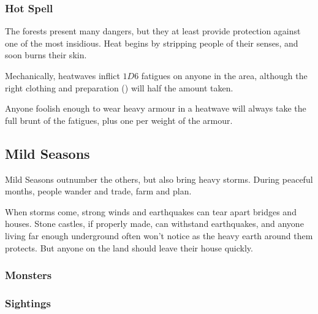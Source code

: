 \begin{multicols}{2}
\subsubsection{Hot Spell}

The forests present many dangers, but they at least provide protection against one of the most insidious.
Heat begins by stripping people of their senses, and soon burns their skin.

Mechanically, heatwaves inflict $1D6$ \glspl{fatigue} on anyone in the area, although the right clothing and preparation () will half the amount taken.

Anyone foolish enough to wear heavy armour in a heatwave will always take the full brunt of the \glspl{fatigue}, plus one per \gls{weight} of the armour.

\end{multicols}

\bigLine

\begin{multicols}{2}

\subsection{Mild Seasons}

Mild Seasons outnumber the others, but also bring heavy storms.
During peaceful months, people wander and trade, farm and plan.

When storms come, strong winds and earthquakes can tear apart bridges and houses.
Stone castles, if properly made, can withstand earthquakes, and anyone living far enough underground often won't notice as the heavy earth around them protects.
But anyone on the land should leave their house quickly.

\encMildVillages

\encMildEdge

\encMildForest

\begin{multicols}{2}
\subsubsection*{Monsters}
\label{monsterEncounters}

\setcounter{enc}{3}
\begin{dlist}
\end{dlist}

\subsubsection*{Sightings}

\setcounter{track}{2}
\begin{dlist}
\end{dlist}

\end{multicols}

\end{multicols}


